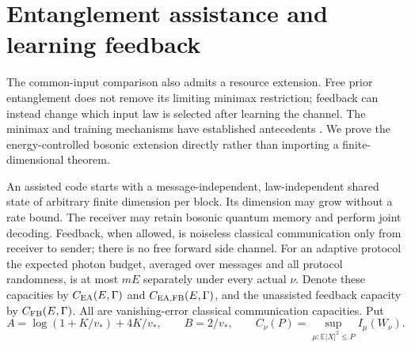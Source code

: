 \documentclass[11pt]{article}
\newcommand{\E}{\mathbb E}
\begin{document}
\section{Entanglement assistance and learning feedback}\label{sec:assisted}

The common-input comparison also admits a resource extension. Free prior
entanglement does not remove its limiting minimax restriction; feedback
can instead change which input law is selected after learning the channel.
The minimax and training mechanisms have established antecedents
\cite{bertaEA,bocheEA,shraderFB}. We prove the energy-controlled bosonic
extension directly rather than importing a finite-dimensional theorem.

An assisted code starts with a message-independent, law-independent shared
state of arbitrary finite dimension per block. Its dimension may grow
without a rate bound. The receiver may retain bosonic quantum memory and
perform joint decoding. Feedback, when allowed, is noiseless classical
communication only from receiver to sender; there is no free forward
side channel. For an adaptive protocol the expected photon budget, averaged
over messages and all protocol randomness, is at most \(mE\) separately
under every actual \(\nu\). Denote these capacities by
\(C_{\rm EA}(E,\Gamma)\) and \(C_{\rm EA,FB}(E,\Gamma)\), and the
unassisted feedback capacity by \(C_{\rm FB}(E,\Gamma)\).
All are vanishing-error classical communication capacities. Put
\[
 A=\log(1+K/v_*)+4K/v_*,\qquad B=2/v_*,\qquad
 C_\nu(P)=\sup_{\mu:\E|X|^2\leq P}I_\mu(W_\nu).
\]
\end{document}
